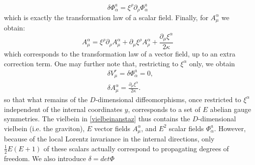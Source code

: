 \documentclass{article}
\begin{document}
\begin{equation*}
    \delta \Phi^a_\alpha = \xi^\rho \partial_\rho \Phi^a_\alpha
\end{equation*}
which is exactly the transformation law of a scalar field. Finally, for $A^\alpha_\mu$ we obtain:
\begin{equation*}
    A^\alpha_\mu= \xi^\rho\partial_\rho A^\alpha_\mu + \partial_\mu \xi^\rho A^\alpha_\rho + \frac{\partial_\mu \xi^\alpha}{2 \kappa}
\end{equation*}
which corresponds to the transformation law of a vector field, up to an extra correction term. One may further note that, restricting to $\xi^\alpha$ only, we obtain
\begin{subequations}
\begin{align}
&\delta V^r_\mu = \delta \Phi^a_\alpha = 0,\\
&\delta A^\alpha_\mu = \frac{\partial_\mu \xi^\alpha}{2\kappa}.
\end{align}
\end{subequations}
so that what remains of the $D$-dimensional diffeomorphisms, once restricted to $\xi^\alpha$ independent of the internal coordinates $y$, corresponds to a set of $E$ abelian gauge symmetries.
The vielbein in \eqref{vielbeinanstaz} thus contains the $D$-dimensional vielbein (i.e. the graviton), $E$ vector fields $A^\alpha_\mu$, and $E^2$ scalar fields $\Phi^a_\alpha$. However, because of the local Lorentz invariance in the internal directions, only $\frac{1}{2}E(E+1)$ of these scalars actually correspond to propagating degrees of freedom. We also introduce $\delta = det \Phi$ 
\end{document}
